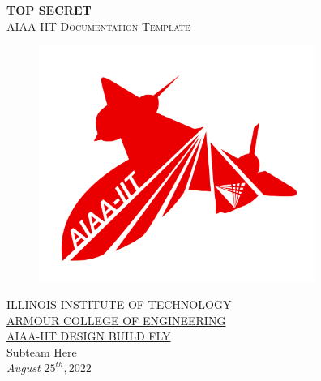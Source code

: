 \documentclass[report]{dbf}
\begin{document}

\setcounter{tocdepth}{3}  
\setcounter{secnumdepth}{3}

\newpage
\begin{center}
\textbf{\color{white}TOP SECRET}\\[.2in]
\Large\textsc{\href{https://aiaa.iit.edu}{AIAA-IIT Documentation Template}} %

\vspace{2.2cm}
\end{center}
\begin{figure}[h]
\centering
\includegraphics[width=9cm]{Images/center_logo.png}\\[.3in]
\end{figure}
\begin{center}
\large{\href{https://www.iit.edu}{ILLINOIS INSTITUTE OF TECHNOLOGY}}\\
\small{\href{https://www.iit.edu/er}{ARMOUR COLLEGE OF ENGINEERING}}\\
\small{\href{https://sites.google.com/iit.edu/aiaaiit/dbf}{AIAA-IIT DESIGN BUILD FLY}}\\[.5in]

Subteam Here \\ %
\textit{August $25^{th}, 2022$}\\ %
\end{center}
\end{document}

